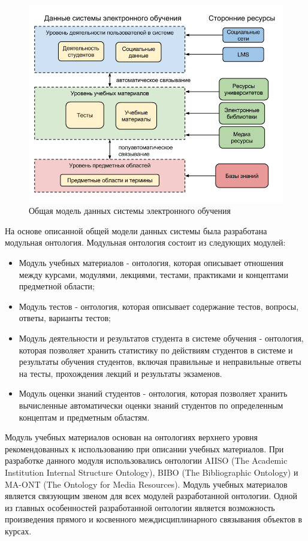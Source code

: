 \begin{figure}[ht] 
  \center
  \includegraphics[scale=0.5]{OverallModel}
  \caption{Общая модель данных системы электронного обучения} 
  \label{fig:OverallModel}
\end{figure}

На основе описанной общей модели данных системы была разработана модульная онтология. Модульная онтология состоит из следующих модулей:


\begin{itemize}
\item Модуль учебных материалов - онтология, которая описывает отношения между курсами, модулями, лекциями, тестами, практиками и концептами предметной области;
\item Модуль тестов - онтология, которая описывает содержание тестов, вопросы, ответы, варианты тестов;
\item Модуль деятельности и результатов студента в системе обучения - онтология, которая позволяет хранить статистику по действиям студентов в системе и результаты обучения студентов, включая правильные и неправильные ответы на тесты, прохождения лекций и результаты экзаменов.
\item Модуль оценки знаний студентов - онтология, которая позволяет хранить вычисленные автоматически оценки знаний студентов по определенным концептам и предметным областям.
\end{itemize}

Модуль учебных материалов основан на онтологиях верхнего уровня рекомендованных к использованию при описании учебных материалов. При разработке данного модуля использовались онтологии AIISO (The Academic Institution Internal Structure Ontology), BIBO (The Bibliographic Ontology) и MA-ONT (The Ontology for Media Resources). Модуль учебных материалов является связующим звеном для всех модулей разработанной онтологии. Одной из главных особенностей разработанной онтологии является возможность произведения прямого и косвенного междисциплинарного связывания объектов в курсах. 




